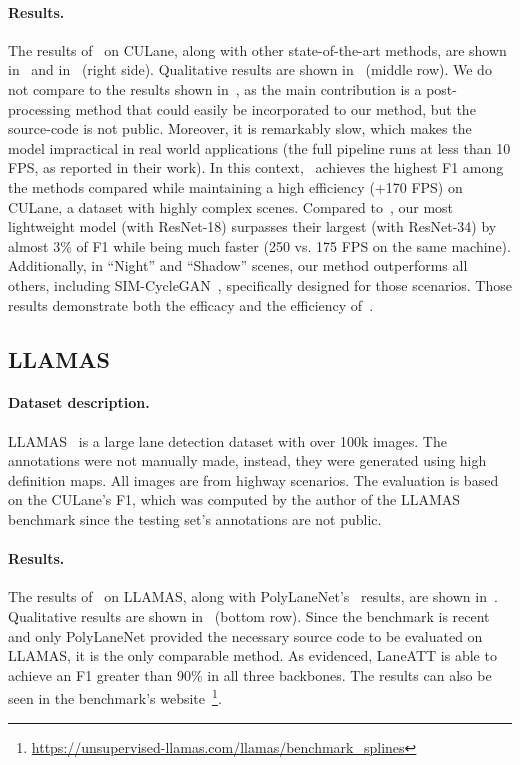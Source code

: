 \documentclass[final]{cvpr}
\begin{document}
\paragraph{Results.}





The results of \methodname~on CULane, along with other state-of-the-art methods, are shown in~ and in~ (right side). Qualitative results are shown in~ (middle row). We do not compare to the results shown in~\cite{rgconstraints}, as the main contribution is a post-processing method that could easily be incorporated to our method, but the source-code is not public. Moreover, it is remarkably slow, which makes the model impractical in real world applications (the full pipeline runs at less than 10 FPS, as reported in their work).
In this context, \methodname~achieves the highest F1 among the methods compared while maintaining a high efficiency (+170 FPS) on CULane, a dataset with highly complex scenes. Compared to~\cite{ufsa}, our most lightweight model (with ResNet-18) surpasses their largest (with ResNet-34) by almost 3\% of F1 while being much faster (250 vs. 175 FPS on the same machine). Additionally, in ``Night'' and ``Shadow'' scenes, our method outperforms all others, including SIM-CycleGAN~\cite{sim-cyclegan}, specifically designed for those scenarios. Those results demonstrate both the efficacy and the efficiency of~\methodname.

\subsection{LLAMAS}
\label{sec:llamas}
\paragraph{Dataset description.}
LLAMAS~\cite{llamas} is a large lane detection dataset with over 100k images. The annotations were not manually made, instead, they were generated using high definition maps. All images are from highway scenarios. 
The evaluation is based on the CULane's F1, which was computed by the author of the LLAMAS benchmark since the testing set's annotations are not public.

\paragraph{Results.}
The results of \methodname~on LLAMAS, along with PolyLaneNet's~\cite{polylanenet} results, are shown in~. Qualitative results are shown in~ (bottom row).
Since the benchmark is recent and only PolyLaneNet provided the necessary source code to be evaluated on LLAMAS, it is the only comparable method. As evidenced, LaneATT is able to achieve an F1 greater than 90\% in all three backbones. The results can also be seen in the benchmark's website~\footnote{\url{https://unsupervised-llamas.com/llamas/benchmark_splines}}.
\end{document}
